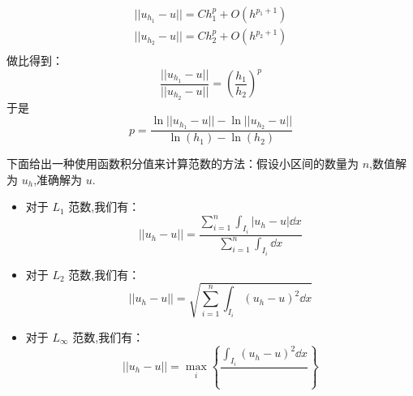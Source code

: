 \documentclass{book}
\begin{document}
\begin{equation}
    \begin{aligned}
        || u_{h_1}-u || = Ch_1^p + O(h^{p_1+1}) \\
        || u_{h_2}-u || = Ch_2^p + O(h^{p_2+1}) \\
    \end{aligned}
\end{equation}
做比得到：
\begin{equation}
    \frac{|| u_{h_1}-u ||}{|| u_{h_2}-u ||} = \left(\frac{h_1}{h_2}\right)^p
\end{equation}
于是
\begin{equation}
    p = \frac{\ln|| u_{h_1}-u ||-\ln|| u_{h_2}-u ||}{\ln(h_1)-\ln(h_2)}
\end{equation}

下面给出一种使用函数积分值来计算范数的方法：假设小区间的数量为 $n$,数值解为 $u_h$,准确解为 $u$.
\begin{itemize}
    \item 对于 $L_1$ 范数,我们有：
          \begin{equation}
              || u_{h}-u || = \frac{\sum_{i=1}^{n}\int_{I_i}|u_{h}-u|\dd x }{\sum_{i=1}^{n}\int_{I_i}\dd x}
          \end{equation}

    \item 对于 $L_2$ 范数,我们有：
          \begin{equation}
              || u_{h}-u || = \sqrt{\sum_{i=1}^{n}\int_{I_i}\left(u_{h}-u\right)^2\dd x}
          \end{equation}
    \item 对于 $L_\infty$ 范数,我们有：
          \begin{equation}
              || u_{h}-u || = \max_i \left\{\frac{\int_{I_i}\left(u_{h}-u\right)^2\dd x}{} \right\}
          \end{equation}
\end{itemize}
\end{document}
